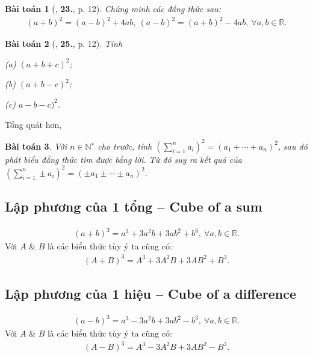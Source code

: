 \documentclass[oneside]{book}
\numberwithin{equation}{section}
\newtheorem{baitoan}{Bài toán}[section]
\begin{document}
\begin{baitoan}[\cite{SGK_Toan_8_tap_1}, \textbf{23.}, p. 12]
	Chứng minh các đẳng thức sau:
	\begin{align*}
		(a + b)^2 = (a - b)^2 + 4ab,\ (a - b)^2 = (a + b)^2 - 4ab,\ \forall a,b\in\mathbb{R}.
	\end{align*}
\end{baitoan}

\begin{baitoan}[\cite{SGK_Toan_8_tap_1}, \textbf{25.}, p. 12]
	Tính
	\begin{enumerate*}
		\item[(a)] $(a + b + c)^2$;
		\item[(b)] $(a + b - c)^2$;
		\item[(c)] $a - b - c)^2$.
	\end{enumerate*}
\end{baitoan}
Tổng quát hơn,
\begin{baitoan}
	Với $n\in\mathbb{N}^\star$ cho trước, tính $\left(\sum_{i=1}^n a_i\right)^2 = (a_1 + \cdots + a_n)^2$, sau đó phát biểu đẳng thức tìm được bằng lời. Từ đó suy ra kết quả của $\left(\sum_{i=1}^n \pm a_i\right)^2 = (\pm a_1\pm\cdots\pm a_n)^2$.
\end{baitoan}

\subsection{Lập phương của 1 tổng -- Cube of a sum}
\begin{align}
	\label{cube of a sum}
	(a + b)^3 = a^3 + 3a^2b + 3ab^2 + b^3,\ \forall a,b\in\mathbb{R}.
\end{align}
Với $A$ \& $B$ là các biểu thức tùy ý ta cũng có:
\begin{align*}
	(A + B)^3 = A^3 + 3A^2B + 3AB^2 + B^3.
\end{align*}

\subsection{Lập phương của 1 hiệu -- Cube of a difference}
\begin{align}
	\label{cube of a difference}
	(a - b)^3 = a^3 - 3a^2b + 3ab^2 - b^3,\ \forall a,b\in\mathbb{R}.
\end{align}
Với $A$ \& $B$ là các biểu thức tùy ý ta cũng có:
\begin{align*}
	(A - B)^3 = A^3 - 3A^2B + 3AB^2 - B^3.
\end{align*}
\end{document}
